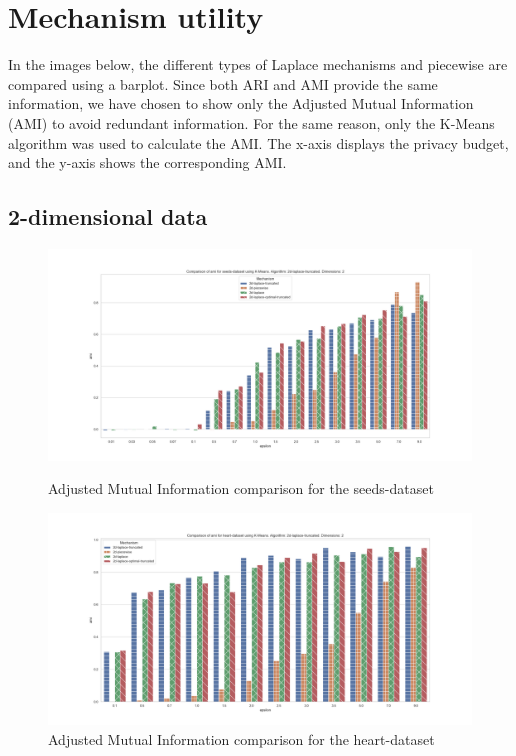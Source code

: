 \section{Mechanism utility}
In the images below, the different types of Laplace mechanisms and piecewise are compared using a barplot.
Since both ARI and AMI provide the same information, we have chosen to show only the Adjusted Mutual Information (AMI) to avoid redundant information. For the same reason, only the K-Means algorithm was used to calculate the AMI.
The x-axis displays the privacy budget, and the y-axis shows the corresponding AMI.

\subsection{2-dimensional data}
\begin{figure}[H]
    \centering
    \begin{minipage}[c]{0.8\textwidth}
        \includegraphics[width=1\textwidth]{Results/RQ1/seeds-dataset/ami_seeds-dataset_comparison.png}
        \caption{Adjusted Mutual Information comparison for the seeds-dataset}
        \label{fig:ami_seeds-dataset_comparison_2d}
    \end{minipage}
    \begin{minipage}[c]{0.8\textwidth}
        \includegraphics[width=1\textwidth]{Results/RQ1/heart-dataset/ami_heart-dataset_comparison.png}
        \caption{Adjusted Mutual Information comparison for the heart-dataset}
        \label{fig:ami_heart-dataset_comparison_2d}
    \end{minipage}

\end{figure}


